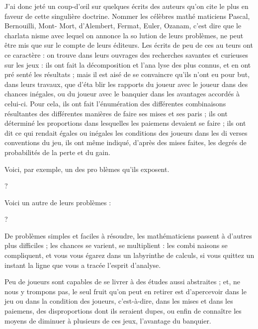 J'ai donc jeté un coup-d'œil sur
quelques écrits des auteurs qu'on cite
le plus en faveur de cette singulière
doctrine. Nommer les célèbres mathé%
maticiens Pascal, Bernouilli, Mont-%
Mort, d'Alembert, Fermat, Euler,
Ozanam, c'est dire que le charlata%
nisme avec lequel on annonce la so%
lution de leurs problèmes, ne peut
être mis que sur le compte de leurs
éditeurs. Les écrits de peu de ces au%
teurs ont ce caractère : on trouve
dans leurs ouvrages des recherches
savantes et curieuses sur les jeux :
ils ont fait la décomposition et l'ana%
lyse des plus connus, et en ont pré%
senté les résultats ; mais il est aisé de
se convaincre qu'ils n'ont eu pour
but, dans leurs travaux, que d'éta%
blir les rapports du joueur avec le
joueur dans des chances inégales, ou
du joueur avec le banquier dans les
avantages accordés à celui-ci. Pour
cela, ils ont fait l'énumération des
différentes combinaisons résultantes
des différentes manières de faire ses
mises et ses paris ; ils ont déterminé
les proportions dans lesquelles les
paiemens devaient se faire ; ils ont dit
ce qui rendait égales ou inégales les
conditions des joueurs dans les di%
verses conventions du jeu, ils ont
même indiqué, d'après des mises
faites, les degrés de probabilités de la
perte et du gain.

Voici, par exemple, un des pro%
blèmes qu'ils exposent.

 ?

Voici un autre de leurs problèmes :

 ?

De problèmes simples et faciles à
résoudre, les mathématiciens passent
à d'autres plus difficiles ; les chances
se varient, se multiplient : les combi%
naisons se compliquent, et vous vous
égarez dans un labyrinthe de calculs,
si vous quittez un instant la ligne que
vous a tracée l'esprit d'analyse.

Peu de joueurs sont capables de se
livrer à des études aussi abstraites ; et,
ne nous y trompons pas, le seul fruit
qu'on peut en retirer est d'apercevoir
dans le jeu ou dans la condition des
joueurs, c'est-à-dire, dans les mises et
dans les paiemens, des disproportions
dont ils seraient dupes, ou enfin de
connaître les moyens de diminuer à
plusieurs de ces jeux, l'avantage du
banquier.

